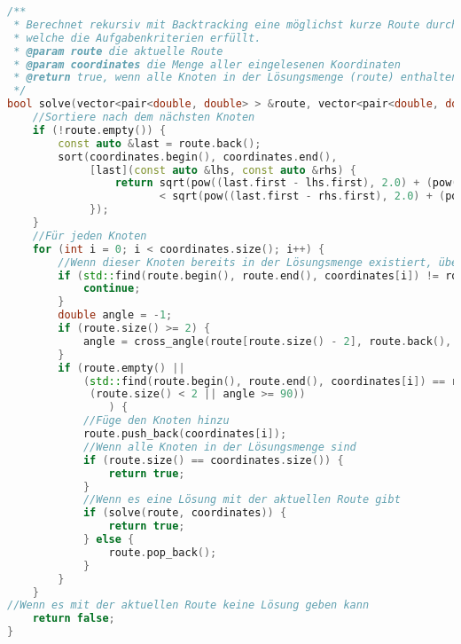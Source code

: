 \documentclass[a4paper,10pt,ngerman]{scrartcl}
\begin{document}
    \newpage
    \begin{lstlisting}[frame=single,language=C++,title=Methode solve,breaklines=true,label={lst:code_solve}]
/**
 * Berechnet rekursiv mit Backtracking eine möglichst kurze Route durch den Graphen,
 * welche die Aufgabenkriterien erfüllt.
 * @param route die aktuelle Route
 * @param coordinates die Menge aller eingelesenen Koordinaten
 * @return true, wenn alle Knoten in der Lösungsmenge (route) enthalten sind, andernfalls false
 */
bool solve(vector<pair<double, double> > &route, vector<pair<double, double> > &coordinates) {
    //Sortiere nach dem nächsten Knoten
    if (!route.empty()) {
        const auto &last = route.back();
        sort(coordinates.begin(), coordinates.end(),
             [last](const auto &lhs, const auto &rhs) {
                 return sqrt(pow((last.first - lhs.first), 2.0) + (pow((last.second - lhs.second), 2.0)))
                        < sqrt(pow((last.first - rhs.first), 2.0) + (pow((last.second - rhs.second), 2.0)));
             });
    }
    //Für jeden Knoten
    for (int i = 0; i < coordinates.size(); i++) {
        //Wenn dieser Knoten bereits in der Lösungsmenge existiert, überspringe diesen
        if (std::find(route.begin(), route.end(), coordinates[i]) != route.end()) {
            continue;
        }
        double angle = -1;
        if (route.size() >= 2) {
            angle = cross_angle(route[route.size() - 2], route.back(), coordinates[i]);
        }
        if (route.empty() ||
            (std::find(route.begin(), route.end(), coordinates[i]) == route.end() &&
             (route.size() < 2 || angle >= 90))
                ) {
            //Füge den Knoten hinzu
            route.push_back(coordinates[i]);
            //Wenn alle Knoten in der Lösungsmenge sind
            if (route.size() == coordinates.size()) {
                return true;
            }
            //Wenn es eine Lösung mit der aktuellen Route gibt
            if (solve(route, coordinates)) {
                return true;
            } else {
                route.pop_back();
            }
        }
    }
//Wenn es mit der aktuellen Route keine Lösung geben kann
    return false;
}
    \end{lstlisting}
\end{document}

